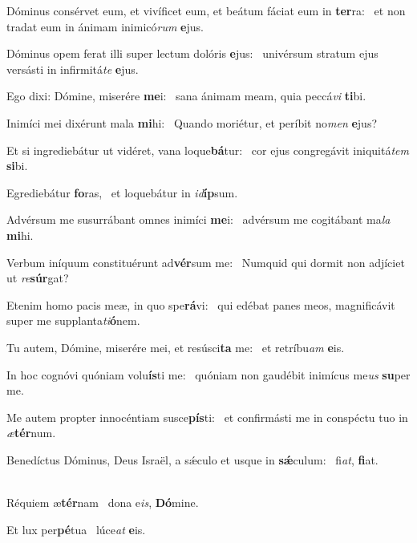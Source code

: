 \item Dóminus consérvet eum, et vivíficet eum, et beátum fáciat eum in \textbf{ter}ra:~\psstar{} et non tradat eum in ánimam inimicó\textit{rum} \textbf{e}jus.

\item Dóminus opem ferat illi super lectum dolóris \textbf{e}jus:~\psstar{} univérsum stratum ejus versásti in infirmitá\textit{te} \textbf{e}jus.

\item Ego dixi: Dómine, miserére \textbf{me}i:~\psstar{} sana ánimam meam, quia peccá\textit{vi} \textbf{ti}bi.

\item Inimíci mei dixérunt mala \textbf{mi}hi:~\psstar{} Quando moriétur, et períbit no\textit{men} \textbf{e}jus?

\item Et si ingrediebátur ut vidéret, vana loque\textbf{bá}tur:~\psstar{} cor ejus congregávit iniquitá\textit{tem} \textbf{si}bi.

\item Egrediebátur \textbf{fo}ras,~\psstar{} et loquebátur in \textit{id}\textbf{íp}sum.

\item Advérsum me susurrábant omnes inimíci \textbf{me}i:~\psstar{} advérsum me cogitábant ma\textit{la} \textbf{mi}hi.

\item Verbum iníquum constituérunt ad\textbf{vér}sum me:~\psstar{} Numquid qui dormit non adjíciet ut \textit{re}\textbf{súr}gat?

\item Etenim homo pacis meæ, in quo spe\textbf{rá}vi:~\psstar{} qui edébat panes meos, magnificávit super me supplanta\textit{ti}\textbf{ó}nem.

\item Tu autem, Dómine, miserére mei, et resúsci\textbf{ta} me:~\psstar{} et retríbu\textit{am} \textbf{e}is.

\item In hoc cognóvi quóniam volu\textbf{ís}ti me:~\psstar{} quóniam non gaudébit inimícus me\textit{us} \textbf{su}per me.

\item Me autem propter innocéntiam susce\textbf{pís}ti:~\psstar{} et confirmásti me in conspéctu tuo in \textit{æ}\textbf{tér}num.

\item Benedíctus Dóminus, Deus Israël, a sǽculo et usque in \textbf{sǽ}culum:~\psstar{} fi\textit{at}, \textbf{fi}at.

\item ~\\Réquiem æ\textbf{tér}nam~\psstar{} dona e\textit{is}, \textbf{Dó}mine.

\item Et lux per\textbf{pé}tua~\psstar{} lúce\textit{at} \textbf{e}is.